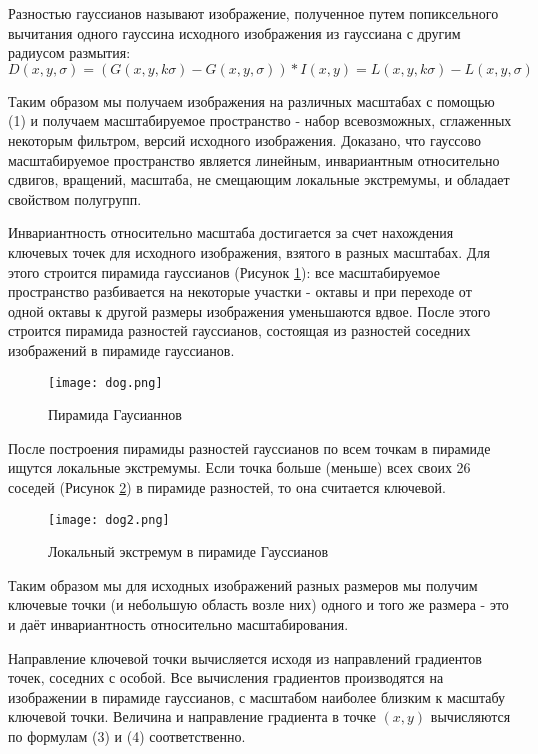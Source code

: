 Разностью гауссианов называют изображение, полученное путем попиксельного вычитания одного гауссина исходного изображения из гауссиана с другим радиусом размытия:
\begin{equation}
    D(x,y,\sigma) = (G(x,y,k\sigma)-G(x,y,\sigma)) * I(x,y) = L(x,y,k\sigma) - L(x,y,\sigma)
\end{equation}

Таким образом мы получаем изображения на различных масштабах с помощью (1) и получаем масштабируемое пространство - набор всевозможных, сглаженных некоторым фильтром, версий исходного изображения. Доказано, что гауссово масштабируемое пространство является линейным, инвариантным относительно сдвигов, вращений, масштаба, не смещающим локальные экстремумы, и обладает свойством полугрупп.

Инвариантность относительно масштаба достигается за счет нахождения ключевых точек для исходного изображения, взятого в разных масштабах. Для этого строится пирамида гауссианов (Рисунок \ref{fig:dog1}): все масштабируемое пространство разбивается на некоторые участки - октавы и при переходе от одной октавы к другой размеры изображения уменьшаются вдвое. После этого строится пирамида разностей гауссианов, состоящая из разностей соседних изображений в пирамиде гауссианов.

\begin{figure}[h]
    \centering
    \texttt{[image: dog.png]}
    \caption{Пирамида Гаусианнов}
    \label{fig:dog1}
\end{figure}

После построения пирамиды разностей гауссианов по всем точкам в пирамиде ищутся локальные экстремумы. Если точка больше (меньше) всех своих 26 соседей (Рисунок \ref{fig:dog2}) в пирамиде разностей, то она считается ключевой.

\begin{figure}[h]
    \centering
    \texttt{[image: dog2.png]}
    \caption{Локальный экстремум в пирамиде Гауссианов}
    \label{fig:dog2}
\end{figure}

Таким образом мы для исходных изображений разных размеров мы получим ключевые точки (и небольшую область возле них) одного и того же размера - это и даёт инвариантность относительно масштабирования.

Направление ключевой точки вычисляется исходя из направлений градиентов точек, соседних с особой. Все вычисления градиентов производятся на изображении в пирамиде гауссианов, с масштабом наиболее близким к масштабу ключевой точки. Величина и направление градиента в точке $(x,y)$ вычисляются по формулам (3) и (4) соответственно.

